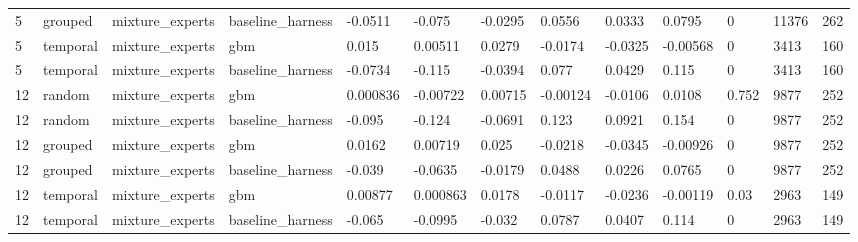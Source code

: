 \begin{tabular}{lllllllllllll}
5 & grouped & mixture\_experts & baseline\_harness & -0.0511 & -0.075 & -0.0295 & 0.0556 & 0.0333 & 0.0795 & 0 & 11376 & 262 \\
5 & temporal & mixture\_experts & gbm & 0.015 & 0.00511 & 0.0279 & -0.0174 & -0.0325 & -0.00568 & 0 & 3413 & 160 \\
5 & temporal & mixture\_experts & baseline\_harness & -0.0734 & -0.115 & -0.0394 & 0.077 & 0.0429 & 0.115 & 0 & 3413 & 160 \\
12 & random & mixture\_experts & gbm & 0.000836 & -0.00722 & 0.00715 & -0.00124 & -0.0106 & 0.0108 & 0.752 & 9877 & 252 \\
12 & random & mixture\_experts & baseline\_harness & -0.095 & -0.124 & -0.0691 & 0.123 & 0.0921 & 0.154 & 0 & 9877 & 252 \\
12 & grouped & mixture\_experts & gbm & 0.0162 & 0.00719 & 0.025 & -0.0218 & -0.0345 & -0.00926 & 0 & 9877 & 252 \\
12 & grouped & mixture\_experts & baseline\_harness & -0.039 & -0.0635 & -0.0179 & 0.0488 & 0.0226 & 0.0765 & 0 & 9877 & 252 \\
12 & temporal & mixture\_experts & gbm & 0.00877 & 0.000863 & 0.0178 & -0.0117 & -0.0236 & -0.00119 & 0.03 & 2963 & 149 \\
12 & temporal & mixture\_experts & baseline\_harness & -0.065 & -0.0995 & -0.032 & 0.0787 & 0.0407 & 0.114 & 0 & 2963 & 149 \\
\bottomrule
\end{tabular}
